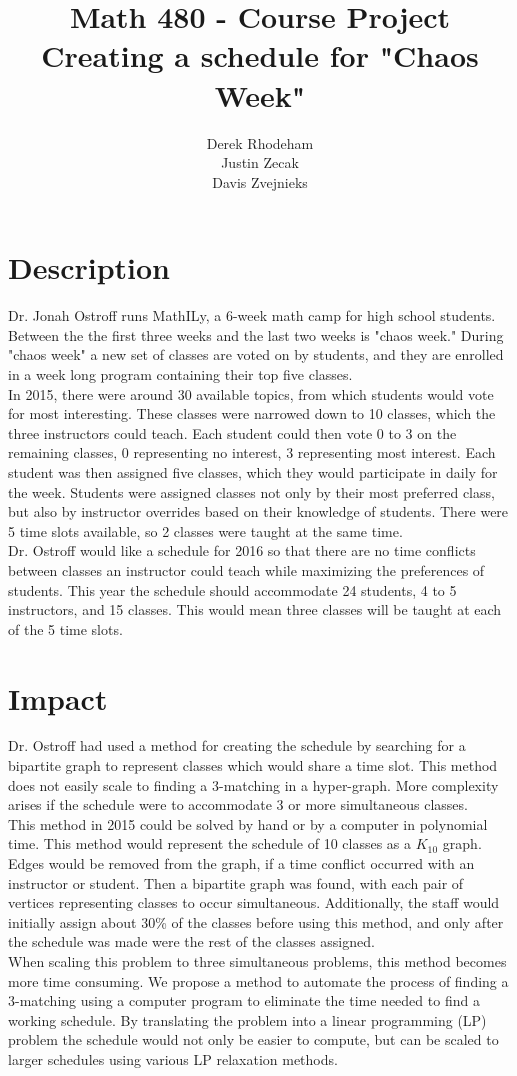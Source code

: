 \documentclass[11pt]{article}
\title{\textbf{Math 480 - Course Project}
			  \\Creating a schedule for "Chaos Week"}
\author{Derek Rhodeham\\
		Justin Zecak\\
		Davis Zvejnieks}
\date{}
\begin{document}
\maketitle

\section{Description}
Dr. Jonah Ostroff runs MathILy, a 6-week math camp for high school students. Between the the first three weeks and the last two weeks is "chaos week." During "chaos week" a new set of classes are voted on by students, and they are enrolled in a week long program containing their top five classes.\\
\indent In 2015, there were around 30 available topics, from which students would vote for most interesting. These classes were narrowed down to 10 classes, which the three instructors could teach. Each student could then vote 0 to 3 on the remaining classes, 0 representing no interest, 3 representing most interest. Each student was then assigned five classes, which they would participate in daily for the week. Students were assigned classes not only by their most preferred class, but also by instructor overrides based on their knowledge of students. There were 5 time slots available, so 2 classes were taught at the same time.\\
\indent Dr. Ostroff would like a schedule for 2016 so that there are no time conflicts between classes an instructor could teach while maximizing the preferences of students. This year the schedule should accommodate 24 students, 4 to 5 instructors, and 15 classes. This would mean three classes will be taught at each of the 5 time slots.


\section{Impact}
Dr. Ostroff had used a method for creating the schedule by searching for a bipartite graph to represent classes which would share a time slot. This method does not easily scale to finding a 3-matching in a hyper-graph. More complexity arises if the schedule were to accommodate 3 or more simultaneous classes.\\
\indent This method in 2015 could be solved by hand or by a computer in polynomial time. This method would represent the schedule of 10 classes as a $K_{10}$ graph. Edges would be removed from the graph, if a time conflict occurred with an instructor or student. Then a bipartite graph was found, with each pair of vertices representing classes to occur simultaneous. Additionally, the staff would initially assign about 30\% of the classes before using this method, and only after the schedule was made were the rest of the classes assigned.\\
\indent When scaling this problem to three simultaneous problems, this method becomes more time consuming. We propose a method to automate the process of finding a 3-matching using a computer program to eliminate the time needed to find a working schedule. By translating the problem into a linear programming (LP) problem the schedule would not only be easier to compute, but can be scaled to larger schedules using various LP relaxation methods.
\end{document}
